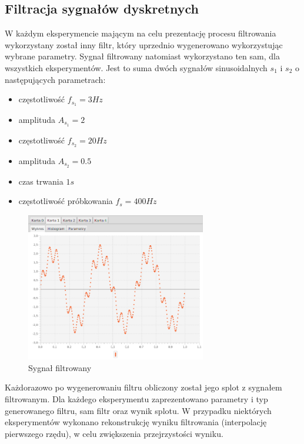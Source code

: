 \documentclass[12pt]{article}
\begin{document}
{        \subsection{Filtracja sygnałów dyskretnych} \label{metody:filtracja}{
            W każdym eksperymencie mającym na celu prezentację procesu filtrowania wykorzystany
            został inny filtr, który uprzednio wygenerowano wykorzystując wybrane parametry. Sygnał
            filtrowany natomiast wykorzystano ten sam, dla wszystkich eksperymentów. Jest to
            suma dwóch sygnałów sinusoidalnych $s_1$ i $s_2$ o następujących parametrach:
            \begin{itemize}
                \item częstotliwość $f_{s_1} = 3Hz$
                \item amplituda $A_{s_1} = 2$
                \item częstotliwość $f_{s_2} = 20Hz$
                \item amplituda $A_{s_2} = 0.5$
                \item czas trwania $1s$
                \item częstotliwość próbkowania $f_s = 400Hz$
            \end{itemize}
            \begin{figure}[H]
                \centering
                \includegraphics[width=0.7\textwidth]{img/result/filter/filtered.png}
                \caption{Sygnał filtrowany} \label{wykres:filtrowany}
            \end{figure}
            Każdorazowo po wygenerowaniu filtru obliczony został jego splot z sygnałem
            filtrowanym. Dla każdego eksperymentu zaprezentowano parametry i typ generowanego
            filtru, sam filtr oraz wynik splotu. W przypadku niektórych eksperymentów wykonano
            rekonstrukcję wyniku filtrowania (interpolację pierwszego rzędu), w celu zwiększenia
            przejrzystości wyniku.
        }

}
\end{document}

